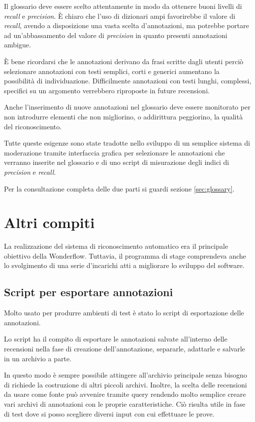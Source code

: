 Il glossario deve essere scelto attentamente in modo da ottenere buoni livelli
di \textit{recall} e \textit{precision}. È chiaro che l'uso di dizionari ampi
favorirebbe il valore di \textit{recall}, avendo a disposizione una vasta scelta
d'annotazioni, ma potrebbe portare ad un'abbassamento del valore di
\textit{precision} in quanto presenti annotazioni ambigue.

È bene ricordarsi che le annotazioni derivano da frasi scritte dagli utenti
perciò selezionare annotazioni con testi semplici, corti e generici aumentano
la possibilità di individuazione. Difficilmente annotazioni con testi lunghi,
complessi, specifici su un argomento verrebbero riproposte in future recensioni.

Anche l'inserimento di nuove annotazioni nel glossario deve essere monitorato
per non introdurre elementi che non migliorino, o addirittura peggiorino, la
qualità del riconoscimento.

Tutte queste esigenze sono state tradotte nello sviluppo di un semplice sistema
di moderazione tramite interfaccia grafica per selezionare le
annotazioni che verranno inserite nel glossario e di uno \gls{script} di
misurazione degli indici di \textit{precision} e \textit{recall}.

Per la consultazione completa delle due parti si guardi sezione 
\ref{sec:glossary}.

\section{Altri compiti}
La realizzazione del sistema di riconoscimento automatico era il principale
obiettivo della Wonderflow. Tuttavia, il programma di stage comprendeva anche lo
svolgimento di una serie d'incarichi atti a migliorare lo sviluppo del software.

\subsection{Script per esportare annotazioni}
Molto usato per produrre ambienti di test è stato lo \gls{script} di
esportazione delle annotazioni.

Lo \gls{script} ha il compito di esportare le annotazioni salvate all'interno
delle recensioni nella fase di creazione dell'annotazione, separarle, adattarle
e salvarle in un archivio a parte.

In questo modo è sempre possibile attingere all'archivio principale senza
bisogno di richiede la costruzione di altri piccoli archivi. Inoltre, la scelta
delle recensioni da usare come fonte può avvenire tramite query rendendo molto
semplice creare vari archivi di annotazioni con le proprie caratteristiche. Ciò
risulta utile in fase di test dove si posso scegliere diversi input con cui
effettuare le prove.

